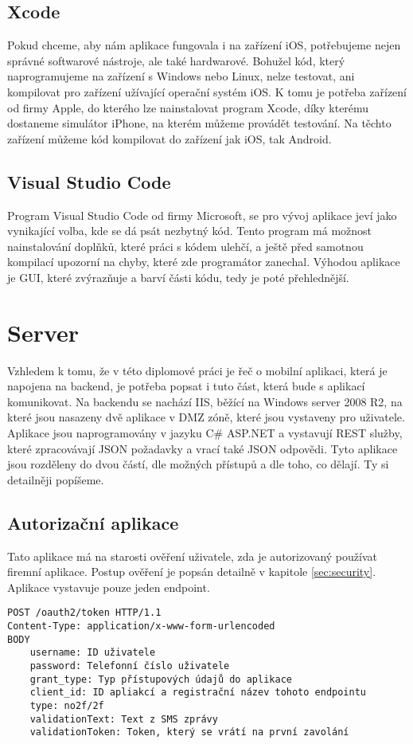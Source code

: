 \documentclass[11pt,twoside,a4paper]{book}
\begin{document}
\subsection{Xcode}
Pokud chceme, aby nám aplikace fungovala i na zařízení iOS, potřebujeme nejen správné softwarové nástroje, ale také hardwarové. Bohužel kód, který naprogramujeme na zařízení s Windows nebo Linux, nelze testovat, ani kompilovat pro zařízení užívající operační systém iOS. K tomu je potřeba zařízení od firmy Apple, do kterého lze nainstalovat program Xcode, díky kterému dostaneme simulátor iPhone, na kterém můžeme provádět testování. Na těchto zařízení můžeme kód kompilovat do zařízení jak iOS, tak Android.

\subsection{Visual Studio Code}
Program Visual Studio Code od firmy Microsoft, se pro vývoj aplikace jeví jako vynikající volba, kde se dá psát nezbytný kód. Tento program má možnost nainstalování doplňků, které práci s kódem ulehčí, a ještě před samotnou kompilací upozorní na chyby, které zde programátor zanechal. Výhodou aplikace je GUI, které zvýrazňuje a barví části kódu, tedy je poté přehlednější. 

\section{Server} \label{sec:server}
Vzhledem k tomu, že v této diplomové práci je řeč o mobilní aplikaci, která je napojena na backend, je potřeba popsat i tuto část, která bude s aplikací komunikovat. Na backendu se nachází IIS, běžící na Windows server 2008 R2, na které jsou nasazeny dvě aplikace v DMZ zóně, které jsou vystaveny pro uživatele. Aplikace jsou naprogramovány v jazyku C\# ASP.NET a vystavují REST služby, které zpracovávají JSON požadavky a vrací také JSON odpovědi. Tyto aplikace jsou rozděleny do dvou částí, dle možných přístupů a dle toho, co dělají. Ty si detailněji popíšeme.

\subsection{Autorizační aplikace} \label{sec:authAPI}
Tato aplikace má na starosti ověření uživatele, zda je autorizovaný používat firemní aplikace. Postup ověření je popsán detailně v kapitole \ref{sec:security}. Aplikace vystavuje pouze jeden endpoint.

\begin{minipage}{\linewidth}
\begin{verbatim}
POST /oauth2/token HTTP/1.1
Content-Type: application/x-www-form-urlencoded
BODY
    username: ID uživatele
    password: Telefonní číslo uživatele
    grant_type: Typ přístupových údajů do aplikace
    client_id: ID apliakcí a registrační název tohoto endpointu
    type: no2f/2f
    validationText: Text z SMS zprávy
    validationToken: Token, který se vrátí na první zavolání
\end{verbatim}
\end{minipage}
\end{document}
